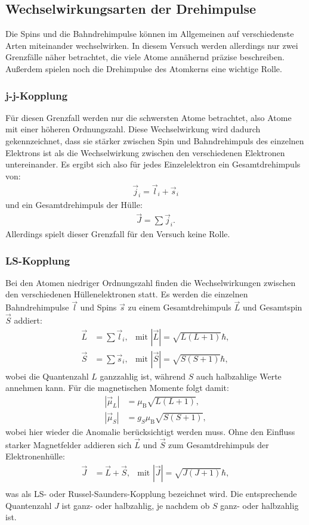 \subsection{Wechselwirkungsarten der Drehimpulse}
\label{sec:Wechselwirkungen}
Die Spins und die Bahndrehimpulse können im Allgemeinen auf verschiedenste Arten miteinander wechselwirken. In diesem Versuch werden allerdings nur zwei Grenzfälle näher betrachtet, die viele Atome annähernd präzise beschreiben. Außerdem spielen noch die Drehimpulse des Atomkerns eine wichtige Rolle.

\subsubsection{j-j-Kopplung}
Für diesen Grenzfall werden nur die schwersten Atome betrachtet, also Atome mit einer höheren Ordnungszahl. Diese Wechselwirkung wird dadurch gekennzeichnet, dass sie stärker zwischen Spin und Bahndrehimpuls des einzelnen Elektrons ist als die Wechselwirkung zwischen den verschiedenen Elektronen untereinander. Es ergibt sich also für jedes Einzelelektron ein Gesamtdrehimpuls von:
\begin{align}
\vec{j}_i=\vec{l}_i+\vec{s}_i
\end{align}
und ein Gesamtdrehimpuls der Hülle:
\begin{align}
\vec{J}=\sum\vec{j}_i.
\end{align}
Allerdings spielt dieser Grenzfall für den Versuch keine Rolle.

\subsubsection{LS-Kopplung}
Bei den Atomen niedriger Ordnungszahl finden die Wechselwirkungen zwischen den verschiedenen Hüllenelektronen statt. Es werden die einzelnen Bahndrehimpulse $\vec{l}$ und Spins $\vec{s}$ zu einem Gesamtdrehimpuls $\vec{L}$ und Gesamtspin $\vec{S}$ addiert:
\begin{align}
\vec{L}&=\sum\vec{l}_i, & \text{mit }|\vec{L}|=\sqrt{L(L+1)}\hbar,\\
\vec{S}&=\sum\vec{s}_i, & \text{mit }|\vec{S}|=\sqrt{S(S+1)}\hbar,
\end{align}
wobei die Quantenzahl $L$ ganzzahlig ist, während $S$ auch halbzahlige Werte annehmen kann. Für die magnetischen Momente folgt damit:
\begin{align}
|\vec{\mu}_L|&=\mu_\text{B}\sqrt{L(L+1)},\\
|\vec{\mu}_S|&=g_S\mu_\text{B}\sqrt{S(S+1)},
\end{align}
wobei hier wieder die Anomalie berücksichtigt werden muss.
Ohne den Einfluss starker Magnetfelder addieren sich $\vec{L}$ und $\vec{S}$ zum Gesamtdrehimpuls der Elektronenhülle:
\begin{align}
\vec{J}&=\vec{L}+\vec{S}, & \text{mit }|\vec{J}|=\sqrt{J(J+1)}\hbar, \\
\end{align}
was als LS- oder Russel-Saunders-Kopplung bezeichnet wird. Die entsprechende Quantenzahl $J$ ist ganz- oder halbzahlig, je nachdem ob $S$ ganz- oder halbzahlig ist.

